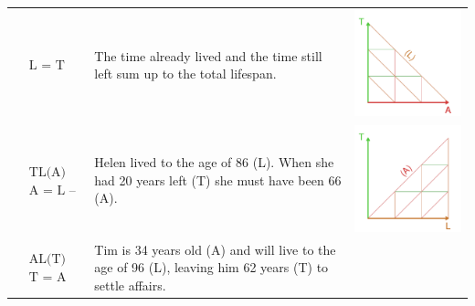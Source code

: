 \documentclass[12pt,oneside,a4paper,doublespacing]{article} %
\theoremstyle{definition}
\begin{document}
\begin{longtable}{m{}L{0.5\textwidth}C{0.2\textwidth}}
$$\begin{aligned}
    &\text{L = T + A}
  \end{aligned}$$ &
  The time already lived and the time still left sum up to the total lifespan. &
  \includegraphics[scale=.5]{Figures/DiagramTable/TA_rt.pdf}   
  \\
  $$\begin{aligned}
    &\text{TL(A)} \\
    &\text{A = L -- T}
  \end{aligned}$$ &
  Helen lived to the age of 86 (L). When she had 20 years left (T) she must have been 66 (A). &
  \includegraphics[scale=.5]{Figures/DiagramTable/TL_rt.pdf}   
 \\
  $$\begin{aligned}
    &\text{AL(T)} \\
    &\text{T = A -- L}
  \end{aligned}$$ &
  Tim is 34 years old (A) and will live to the age of 96 (L), leaving him 62 years (T) to settle affairs. &

\end{longtable}
\end{document}
